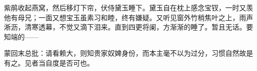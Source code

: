 \begin{parag}


    紫鹃收起燕窝，然后移灯下帘，伏侍黛玉睡下。黛玉自在枕上感念宝钗，一时又羡他有母兄；一面又想宝玉虽素习和睦，终有嫌疑。又听见窗外竹梢焦叶之上，雨声淅沥，清寒透幕，不觉又滴下泪来。直到四更将阑，方渐渐的睡了。暂且无话。要知端的——
\end{parag}

\begin{parag}

    \begin{note}蒙回末总批：请看赖大，则知贵家奴婢身份，而本主毫不以为过分，习惯自然故是有之。见者当自度是否可也。\end{note}
\end{parag}

